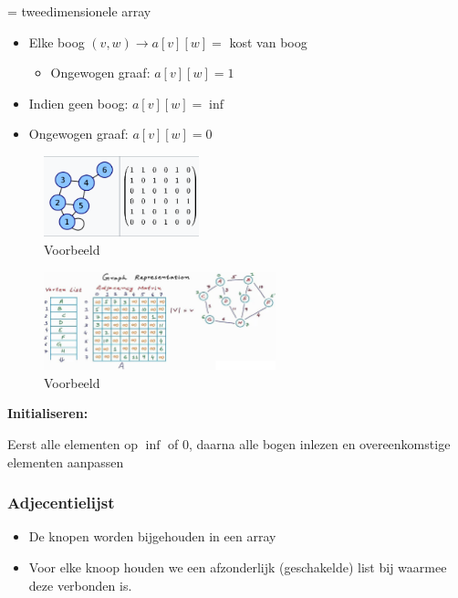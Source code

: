 \documentclass{article}
\begin{document}
= tweedimensionele array

\begin{itemize}
    \item Elke boog $(v,w) \rightarrow a[v][w] =$ kost van boog
    \begin{itemize}
        \item Ongewogen graaf: $a[v][w] = 1$
    \end{itemize} 
    \item Indien geen boog: $a[v][w] = \inf$
    \item Ongewogen graaf: $a[v][w] = 0$
\end{itemize}

\begin{figure}[H]
    \centering
    \includegraphics[width=0.4\textwidth]{adjecentiematrix.png}
    \caption{Voorbeeld}
\end{figure}

\begin{figure}[H]
    \centering
    \includegraphics[width=0.6\textwidth]{adjecentiematrix2.png}
    \caption{Voorbeeld}
\end{figure}

\textbf{Initialiseren:}

Eerst alle elementen op $\inf$ of $0$, daarna alle bogen inlezen en overeenkomstige elementen aanpassen


\subsubsection{Adjecentielijst}

\begin{itemize}
    \item De knopen worden bijgehouden in een array
    \item Voor elke knoop houden we een afzonderlijk (geschakelde) list bij waarmee deze verbonden is.
\end{itemize}
\end{document}
